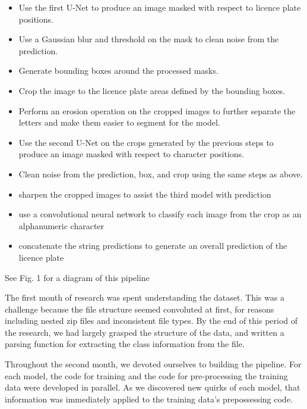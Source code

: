 \documentclass[conference]{IEEEtran}
\begin{document}
\begin{itemize}
\item Use the first U-Net to produce an image masked with respect to licence plate positions.
\item Use a Gaussian blur and threshold on the mask to clean noise from the prediction.
\item Generate bounding boxes around the processed masks.
\item Crop the image to the licence plate areas defined by the bounding boxes.
\item Perform an erosion operation on the cropped images to further separate the letters and make them easier to segment for the model.
\item Use the second U-Net on the crops generated by the previous steps to produce an image masked with respect to character positions.
\item Clean noise from the prediction, box, and crop using the same steps as above.
\item sharpen the cropped images to assist the third model with prediction
\item use a convolutional neural network to classify each image from the crop as an alphanumeric character
\item concatenate the string predictions to generate an overall prediction of the licence plate
\end{itemize}
\par
See Fig. 1 for a diagram of this pipeline

\par
The first month of research was spent understanding the dataset. This was a challenge because the file structure seemed convoluted at first, for reasons including nested zip files and inconsistent file types. By the end of this period of the research, we had largely grasped the structure of the data, and written a parsing function for extracting the class information from the file.
\par
Throughout the second month, we devoted ourselves to building the pipeline. For each model, the code for training and the code for pre-processing the training data were developed in parallel. As we discovered new quirks of each model, that information was immediately applied to the training data's prepossessing code.
\end{document}
